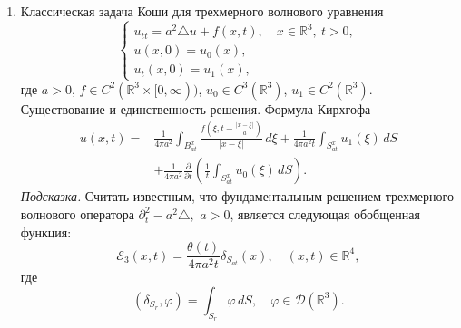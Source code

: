 \documentclass[12pt,a4paper,draft]{article}
\DeclareRobustCommand*{\т}{~--- }
\DeclareRobustCommand*{\ч}{~-- }
\begin{document}
\begin{enumerate}
\item
Классическая задача Коши для трехмерного волнового уравнения
$$
    \left\{
        \begin{array}{l}
            u_{tt} = a^2 \triangle u + f (x, t),
            \quad
            x \in {\mathbb R}^3,
            \:
            t > 0,
            \\
            u (x, 0) = u_0 (x),
            \\
            u_t (x, 0) = u_1 (x),
        \end{array}
    \right.
$$
где $a > 0$, $f \in C^2 ({\mathbb R}^3 \times [0, \infty))$, $u_0
\in C^3 ({\mathbb R}^3)$, $u_1 \in C^2 ({\mathbb R}^3)$.
Существование и единственность решения. Формула Кирхгофа
\begin{align*}
    u (x, t)
    =
    {}
    &
    \frac{
        1
    }{
        4
        \pi
        a^2
    }
    \int_{
        B_{at}^x
    }
    \frac{
        f
        \left(
            \xi,
            t
            - \frac{
            |x - \xi|
            }{
                a
            }
        \right)
    }{
        |x - \xi|
    }
    \,
    d\xi
    +
    \frac{
        1
    }{
        4
        \pi
        a^2
        t
    }
    \int_{
        S_{at}^x
    }
    u_1 (\xi)
    \,
    dS
    \\
    &
    +
        \frac{
            1
        }{
            4
            \pi
            a^2
        }
    \frac{\partial}{\partial t}
    \left(
        \frac{
            1
        }{
            t
        }
        \int_{
            S_{at}^x
        }
        u_0 (\xi)
        \,
        dS
    \right).
\end{align*}
{\it Подсказка.} Считать известным, что фундаментальным решением
трехмерного волнового оператора $
    \partial_t^2 - a^2 \triangle,
$ $a > 0$, является следующая обобщенная функция:
$$
    {\mathcal E}_3 (x, t)
    =
    \frac{
        \theta (t)
    }{
        4
        \pi
        a^2
        t
    }
    \delta_{
        S_{at}
    }
     (x),
    \quad
    (x, t)
    \in
    {\mathbb R}^4,
$$
где
$$
    (\delta_{S_r}, \varphi)
    =
    \int_{
        S_r
    }
    \varphi
    \,
    dS,
    \quad
    \varphi \in {\mathcal D} ({\mathbb R}^3).
$$



\end{enumerate}
\end{document}
